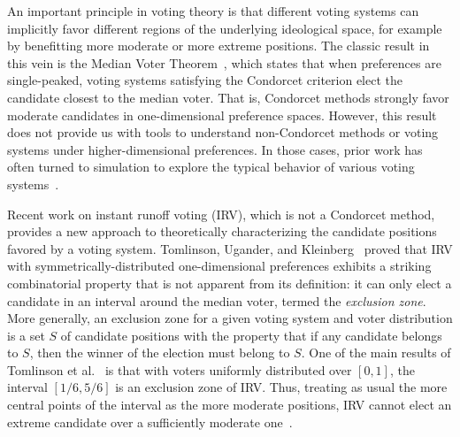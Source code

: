 \documentclass{article}
\theoremstyle{theorem}
\theoremstyle{definition}
\begin{document}
An important principle in voting theory is that different voting systems can implicitly favor different regions of the underlying ideological space, for example by benefitting more moderate or more extreme positions. The classic result in this vein is the Median Voter Theorem~\cite{black1948rationale}, which states that when preferences are single-peaked, voting systems satisfying the Condorcet criterion elect the candidate closest to the median voter. That is, Condorcet methods strongly favor moderate candidates in one-dimensional preference spaces. However, this result does not provide us with tools to understand non-Condorcet methods or voting systems under higher-dimensional preferences. In those cases, prior work has often turned to simulation to explore the typical behavior of various voting systems~\cite{elkind2017multiwinner,mcgann2002party,merrill1984comparison}. 

Recent work on instant runoff voting (IRV), which is not a Condorcet method, provides a new approach to theoretically characterizing the candidate positions favored by a voting system. Tomlinson, Ugander, and Kleinberg~\cite{tomlinson2024moderating} proved that IRV with symmetrically-distributed one-dimensional preferences exhibits a striking combinatorial property that is not apparent from its definition: it can only elect a candidate in an interval around the median voter, termed the \emph{exclusion zone}. More generally, an exclusion zone for a given voting system and voter distribution is a set $S$ of candidate positions with the property that if any candidate belongs to $S$, then the winner of the election must belong to $S$. One of the main results of Tomlinson et al.~\cite{tomlinson2024moderating} is that with voters uniformly distributed over $[0, 1]$, the interval $[1/6, 5/6]$ is an exclusion zone of IRV. Thus, treating as usual the more central points of the interval as the more moderate positions, IRV cannot elect an extreme candidate over a sufficiently moderate one~\cite[Theorem 1]{tomlinson2024moderating}.
\end{document}
